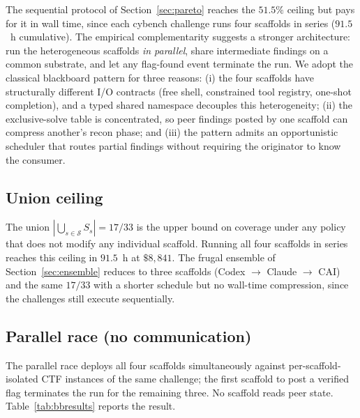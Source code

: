 The sequential protocol of Section~\ref{sec:pareto} reaches the $51.5\%$ ceiling but pays for it in wall time, since each cybench challenge runs four scaffolds in series ($91.5$~h cumulative). The empirical complementarity suggests a stronger architecture: run the heterogeneous scaffolds \emph{in parallel}, share intermediate findings on a common substrate, and let any flag-found event terminate the run. We adopt the classical blackboard pattern \cite{hearsay1980,hayesroth1985blackboard,blackboardllm2025} for three reasons: (i) the four scaffolds have structurally different I/O contracts (free shell, constrained tool registry, one-shot completion), and a typed shared namespace decouples this heterogeneity; (ii) the exclusive-solve table is concentrated, so peer findings posted by one scaffold can compress another's recon phase; and (iii) the pattern admits an opportunistic scheduler that routes partial findings without requiring the originator to know the consumer.

\subsection{Union ceiling}\label{sec:union}

The union $|\bigcup_{s \in \mathcal{S}} S_s| = 17/33$ is the upper bound on coverage under any policy that does not modify any individual scaffold. Running all four scaffolds in series reaches this ceiling in $91.5$~h at $\$8{,}841$. The frugal ensemble of Section~\ref{sec:ensemble} reduces to three scaffolds (Codex $\to$ Claude $\to$ CAI) and the same $17/33$ with a shorter schedule but no wall-time compression, since the challenges still execute sequentially.

\subsection{Parallel race (no communication)}\label{sec:bbresults}

The parallel race deploys all four scaffolds simultaneously against per-scaffold-isolated CTF instances of the same challenge; the first scaffold to post a verified flag terminates the run for the remaining three. No scaffold reads peer state. Table~\ref{tab:bbresults} reports the result.

